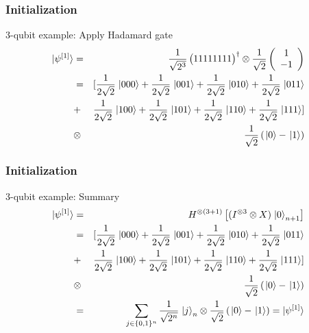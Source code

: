 \begin{frame}
	\frametitle{Initialization}
	\begin{exampleblock}{3-qubit example: Apply Hadamard gate}
		\begin{eqnarray}
			\ket{\psi^{[1]} }&=&\frac{1}{\sqrt{2^{3}}}\begin{pmatrix*}
			1 1 1 1 1 1 1 1
			\end{pmatrix*}^{\dagger}\otimes\frac{1}{\sqrt{2}}\left(\begin{array}{c}
			1\\
			-1
			\end{array}\right)\nonumber\\
			&=&[ \frac{1}{2\sqrt{2}}\left.|000\right\rangle +\frac{1}{2\sqrt{2}}\left.|001\right\rangle +\frac{1}{2\sqrt{2}}\left.|010\right\rangle +\frac{1}{2\sqrt{2}}\left.|011\right\rangle \nonumber\\
			&+&\frac{1}{2\sqrt{2}}\left.|100\right\rangle +\frac{1}{2\sqrt{2}}\left.|101\right\rangle +\frac{1}{2\sqrt{2}}\left.|110\right\rangle +\frac{1}{2\sqrt{2}}\left.|111\right\rangle] \nonumber\\
			&\otimes&\frac{1}{\sqrt{2}}\left(\left.|0\right\rangle -\left.|1\right\rangle \right)		\nonumber	
		\end{eqnarray}
	\end{exampleblock}
\end{frame}

\begin{frame}{}
	\frametitle{Initialization}
	\begin{exampleblock}{3-qubit example: Summary}
		\begin{eqnarray}
			\ket{\psi^{[1]} }&=&
			H^{\otimes\left(3+1\right)}\left[(I^{\otimes3}\otimes X)\left.|0\right\rangle _{n+1}\right]\nonumber\\
			&=&[\frac{1}{2\sqrt{2}}\left.|000\right\rangle +\frac{1}{2\sqrt{2}}\left.|001\right\rangle +\frac{1}{2\sqrt{2}}\left.|010\right\rangle +\frac{1}{2\sqrt{2}}\left.|011\right\rangle\nonumber\\ &+&\frac{1}{2\sqrt{2}}\left.|100\right\rangle +\frac{1}{2\sqrt{2}}\left.|101\right\rangle +\frac{1}{2\sqrt{2}}\left.|110\right\rangle +\frac{1}{2\sqrt{2}}\left.|111\right\rangle ]\nonumber\\
			&\otimes&\frac{1}{\sqrt{2}}\left(\left.|0\right\rangle -\left.|1\right\rangle \right)\nonumber\\
			&=&\sum_{j\in\{0,1\}^{n}}\frac{1}{\sqrt{2^{n}}}\left.|j\right\rangle _{n}\otimes\frac{1}{\sqrt{2}}\left(\left.|0\right\rangle -\left.|1\right\rangle \right)=\ket{\psi^{[1]} }\nonumber
		\end{eqnarray}
	\end{exampleblock}
\end{frame}


